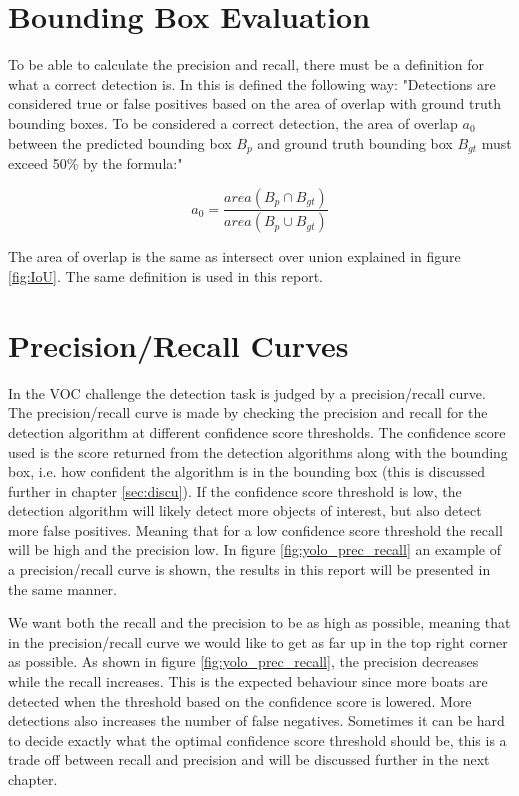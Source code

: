 \newpage

\section{Bounding Box Evaluation}
To be able to calculate the precision and recall, there must be a definition for what a correct detection is. In \citep{Everinghama} this is defined the following way: "Detections are considered true or false positives based on the area of overlap
with ground truth bounding boxes. To be considered a correct detection, the area of overlap $a_0$ between the predicted bounding box $B_p$ and ground truth bounding box $B_{gt}$ must exceed 50\% by the formula:"

\begin{equation*}
    a_0 = \frac{area(B_p \cap B_{gt}) }{area(B_p \cup B_{gt})}
\end{equation*}

The area of overlap is the same as intersect over union explained in figure \ref{fig:IoU}. The same definition is used in this report.




\section{Precision/Recall Curves}

In the VOC challenge \citep{Everinghama} the detection task is judged by a precision/recall curve. The precision/recall curve is made by checking the precision and recall for the detection algorithm at different confidence score thresholds. The confidence score used is the score returned from the detection algorithms along with the bounding box, i.e. how confident the algorithm is in the bounding box (this is discussed further in chapter \ref{sec:discu}). If the confidence score threshold is low, the detection algorithm will likely detect more objects of interest, but also detect more false positives. Meaning that for a low confidence score threshold the recall will be high and the precision low. In figure \ref{fig:yolo_prec_recall} an example of a precision/recall curve is shown, the results in this report will be presented in the same manner. 

\vspace{3mm}

We want both the recall and the precision to be as high as possible, meaning that in the precision/recall curve we would like to get as far up in the top right corner as possible. As shown in figure \ref{fig:yolo_prec_recall}, the precision decreases while the recall increases. This is the expected behaviour since more boats are detected when the threshold based on the confidence score is lowered. More detections also increases the number of false negatives. Sometimes it can be hard to decide exactly what the optimal confidence score threshold should be, this is a trade off between recall and precision and will be discussed further in the next chapter. 


